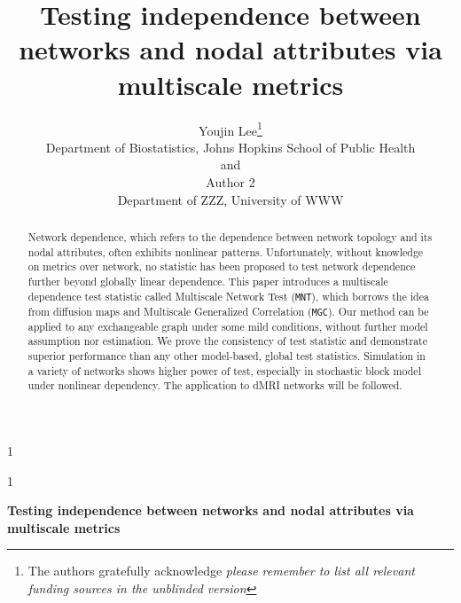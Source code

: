 \documentclass[12pt]{article}
\newcommand{\blind}{1}
\theoremstyle{definition}
\begin{document}
	
	
	\def\spacingset#1{\renewcommand{\baselinestretch}%
		{#1}\small\normalsize} \spacingset{1}
	
	
	
	\blind
	{
		\title{\bf Testing independence between networks and nodal attributes via multiscale metrics}
		\author{Youjin Lee\thanks{
				The authors gratefully acknowledge \textit{please remember to list all relevant funding sources in the unblinded version}}\hspace{.2cm}\\
			Department of Biostatistics, Johns Hopkins School of Public Health\\
			and \\
			Author 2 \\
			Department of ZZZ, University of WWW}
		\maketitle
	} \fi
	
	\blind
	{
		\bigskip
		\bigskip
		\bigskip
		\begin{center}
			{\LARGE\bf Testing independence between networks and nodal attributes via multiscale metrics}
		\end{center}
		\medskip
	} \fi
	
	
\sloppy
\bigskip
\begin{abstract}
		Network dependence, which refers to the dependence between network topology and its nodal attributes, often exhibits nonlinear patterns. Unfortunately, without knowledge on metrics over network, no statistic has been proposed to test network dependence further beyond globally linear dependence. This paper introduces a multiscale dependence test statistic called Multiscale Network Test (\texttt{MNT}), which borrows the idea from diffusion maps and Multiscale Generalized Correlation (\texttt{MGC}). Our method can be applied to any exchangeable graph under some mild conditions, without further model assumption nor estimation. We prove the consistency of test statistic and demonstrate superior performance than any other model-based, global test statistics. Simulation in a variety of networks shows higher power of test, especially in stochastic block model under nonlinear dependency. The application to dMRI networks will be followed. 
\end{abstract}
	
\end{document}
